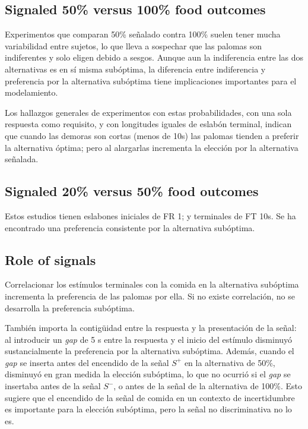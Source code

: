 \documentclass[a4paper,12pt]{article}
\begin{document}
\subsection{Signaled 50\% versus 100\% food outcomes}

Experimentos que comparan 50\% señalado contra 100\% suelen tener mucha variabilidad entre sujetos, lo que lleva a sospechar que las palomas son indiferentes y solo eligen debido a sesgos.
Aunque aun la indiferencia entre las dos alternativas es en sí misma subóptima, la diferencia entre indiferencia y preferencia por la alternativa subóptima tiene implicaciones importantes para el modelamiento.

Los hallazgos generales de experimentos con estas probabilidades, con una sola respuesta como requisito, y con longitudes iguales de eslabón terminal, indican que cuando las demoras son cortas (menos de 10s) las palomas tienden a preferir la alternativa óptima; pero al alargarlas incrementa la elección por la alternativa señalada.

\subsection{Signaled 20\% versus 50\% food outcomes}

Estos estudios tienen eslabones iniciales de FR 1; y terminales de FT 10s.
Se ha encontrado una preferencia consistente por la alternativa subóptima.

\subsection{Role of signals}

Correlacionar los estímulos terminales con la comida en la alternativa subóptima incrementa la preferencia de las palomas por ella.
Si no existe correlación, no se desarrolla la preferencia subóptima.

También importa la contigüidad entre la respuesta y la presentación de la señal: al introducir un {\itshape gap} de 5 s entre la respuesta y el inicio del estímulo disminuyó sustancialmente la preferencia por la alternativa subóptima.
Además, cuando el {\itshape gap} se inserta antes del encendido de la señal $S^{+}$ en la alternativa de 50\%, disminuyó en gran medida la elección subóptima, lo que no ocurrió si el {\itshape gap} se insertaba antes de la señal $S^{-}$, o antes de la señal de la alternativa de 100\%.
Esto sugiere que el encendido de la señal de comida en un contexto de incertidumbre es importante para la elección subóptima, pero la señal no discriminativa no lo es.
\end{document}
